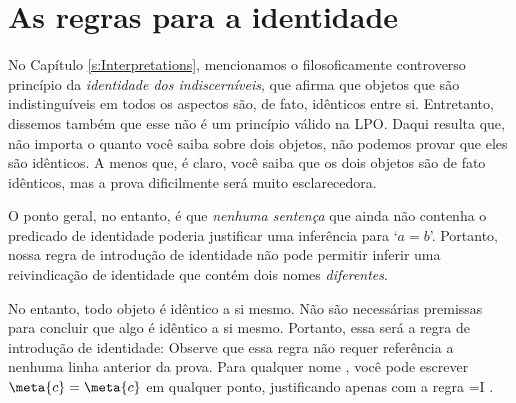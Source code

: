 
\chapter{As regras para a identidade}
No Capítulo  \ref{s:Interpretations}, mencionamos o filosoficamente controverso   princípio da \emph{identidade dos indiscerníveis}, que afirma que objetos que são indistinguíveis em todos os aspectos são, de fato, idênticos entre si. Entretanto, dissemos também que esse não é um princípio válido na LPO.  Daqui resulta que, não importa o quanto você saiba sobre dois objetos, não podemos provar que eles são idênticos. A menos que, é claro, você saiba que os dois objetos são de fato idênticos, mas a prova dificilmente será muito esclarecedora.

 O ponto geral, no entanto, é que \emph{nenhuma sentença} que ainda não contenha o predicado de identidade poderia justificar uma inferência para `$a=b$'. Portanto, nossa regra de introdução de identidade não pode permitir inferir uma reivindicação de identidade que contém dois nomes  \emph{diferentes}.

No entanto, todo objeto é idêntico a si mesmo. Não são necessárias premissas para concluir que algo é idêntico a si mesmo. Portanto, essa será a regra de introdução de identidade:
Observe que essa regra não requer referência a nenhuma linha anterior da prova. Para qualquer nome , você pode escrever $\meta{c}=\meta{c}$ em qualquer ponto, justificando apenas com a regra  {=}I .
 
